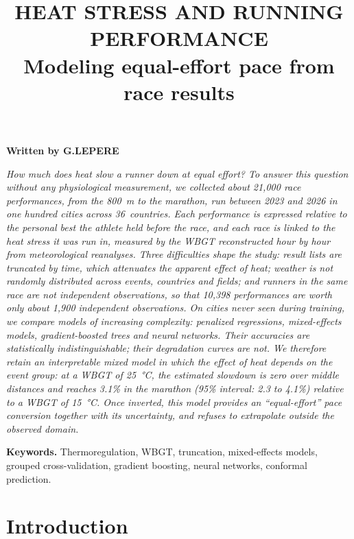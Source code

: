 \documentclass[11pt,a4paper]{article}
\title{\textbf{HEAT STRESS AND RUNNING PERFORMANCE}\\[0.4em]
\large Modeling equal-effort pace from race results}
\date{}
\begin{document}
\maketitle
\vspace{-3em}
\begin{center}
\textbf{Written by G.LEPERE}
\end{center}
\vspace{1.5em}

{\itshape
How much does heat slow a runner down at equal effort? To answer this question without any physiological
measurement, we collected about 21,000 race performances, from the 800~m to the marathon, run between 2023 and 2026
in one hundred cities across 36~countries. Each performance is expressed relative to the personal best the athlete
held before the race, and each race is linked to the heat stress it was run in, measured by the WBGT reconstructed hour
by hour from meteorological reanalyses. Three difficulties shape the study: result lists are truncated by time, which
attenuates the apparent effect of heat; weather is not randomly distributed across events, countries and fields; and
runners in the same race are not independent observations, so that 10,398 performances are worth only about 1,900
independent observations. On cities never seen during training, we compare models of increasing complexity:
penalized regressions, mixed-effects models, gradient-boosted trees and neural networks. Their accuracies are
statistically indistinguishable; their degradation curves are not. We therefore retain an interpretable mixed model
in which the effect of heat depends on the event group: at a WBGT of 25~°C, the estimated slowdown is zero over middle
distances and reaches 3.1\% in the marathon (95\% interval: 2.3 to 4.1\%) relative to a WBGT of 15~°C. Once inverted,
this model provides an ``equal-effort'' pace conversion together with its uncertainty, and refuses to extrapolate
outside the observed domain.\par}

\vspace{0.8em}
\textbf{Keywords.} Thermoregulation, WBGT, truncation, mixed-effects models, grouped cross-validation, gradient
boosting, neural networks, conformal prediction.

\newpage
\tableofcontents
\newpage

\section{Introduction}
\end{document}
